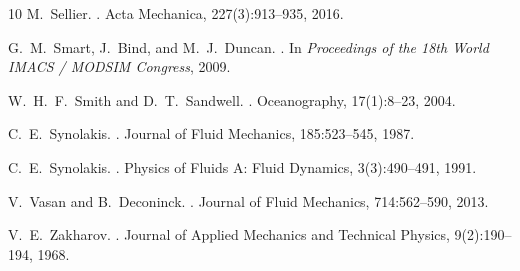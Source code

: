 \documentclass[11pt]{article}
\begin{document}
\begin{thebibliography}{10}
M.~Sellier.
.
\newblock Acta Mechanica, 227(3):913--935, 2016.


G.~M.~Smart, J.~Bind, and M.~J.~Duncan.
.
\newblock In \emph{Proceedings of the 18th World IMACS / MODSIM Congress}, 2009.

W.~H.~F.~Smith and D.~T.~Sandwell.
.
\newblock Oceanography, 17(1):8--23, 2004.


C.~E.~Synolakis.
.
\newblock Journal of Fluid Mechanics, 185:523--545, 1987.

C.~E.~Synolakis.
.
\newblock Physics of Fluids A: Fluid Dynamics, 3(3):490--491, 1991.


V.~Vasan and B.~Deconinck.
.
\newblock Journal of Fluid Mechanics, 714:562--590, 2013.



V.~E.~Zakharov.
.
\newblock Journal of Applied Mechanics and Technical Physics, 9(2):190--194, 1968.
















































\end{thebibliography}
\end{document}
